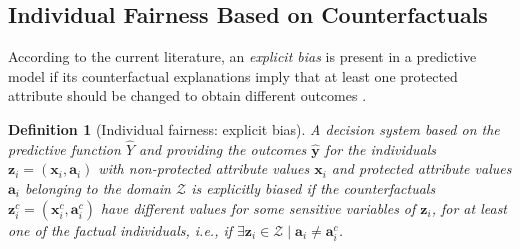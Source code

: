 \documentclass[letterpaper]{article} %
\newtheorem{definition}{Definition}
\DeclareMathOperator*{\argmin}{arg\,min}
\begin{document}

%
%


\subsection{Individual Fairness Based on Counterfactuals}


According to the current literature, an \emph{explicit bias} is present in a predictive model if its counterfactual explanations imply that at least one protected attribute should be changed to obtain different outcomes \cite{sokol2022fat}.

\begin{definition}[Individual fairness: explicit bias]\label{explicit_bias}
	A decision system based on the predictive function $\hat{Y}$ and providing the outcomes $\boldsymbol{\hat{y}}$ for the individuals $\boldsymbol{z}_i = (\boldsymbol{x}_i, \boldsymbol{a}_i)$ with non-protected attribute values $\boldsymbol{x}_{i}$ and protected attribute values $\boldsymbol{a}_{i}$ belonging to the domain $\mathcal{Z}$ is \emph{explicitly biased} if the counterfactuals $\boldsymbol{z}_i^c = (\boldsymbol{x}_i^c, \boldsymbol{a}_i^c)$ have different values for some sensitive variables of $\boldsymbol{z}_i$, for at least one of the factual individuals, i.e., if $\exists \boldsymbol{z}_i \in \mathcal{Z} \mid \boldsymbol{a}_{i} \neq \boldsymbol{a}_{i}^{c}$.
\end{definition}
\end{document}
